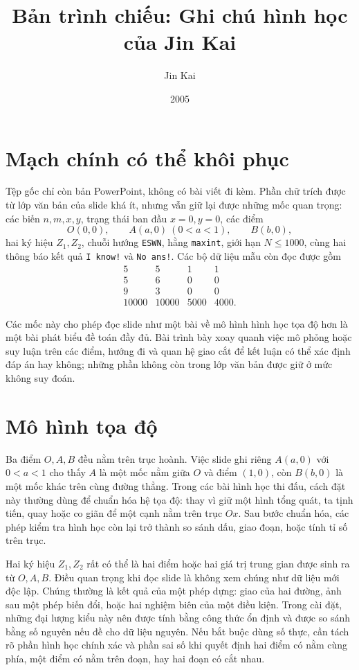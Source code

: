 \documentclass[11pt]{article}
\title{Bản trình chiếu: Ghi chú hình học của Jin Kai}
\author{Jin Kai}
\date{2005}
\begin{document}
\maketitle


\section{Mạch chính có thể khôi phục}

Tệp gốc chỉ còn bản PowerPoint, không có bài viết đi kèm. Phần chữ trích
được từ lớp văn bản của slide khá ít, nhưng vẫn giữ lại được những mốc quan
trọng: các biến \(n,m,x,y\), trạng thái ban đầu \(x=0,y=0\), các điểm
\[
  O(0,0),\qquad A(a,0)\ (0<a<1),\qquad B(b,0),
\]
hai ký hiệu \(Z_1,Z_2\), chuỗi hướng \texttt{ESWN}, hằng \texttt{maxint},
giới hạn \(N\le 1000\), cùng hai thông báo kết quả \texttt{I know!} và
\texttt{No ans!}. Các bộ dữ liệu mẫu còn đọc được gồm
\[
\begin{array}{rrrr}
5&5&1&1\\
5&6&0&0\\
9&3&0&0\\
10000&10000&5000&4000.
\end{array}
\]

Các mốc này cho phép đọc slide như một bài về mô hình hình học tọa độ hơn là
một bài phát biểu đề toán đầy đủ. Bài trình bày xoay quanh việc mô phỏng hoặc
suy luận trên các điểm, hướng đi và quan hệ giao cắt để kết luận có thể xác
định đáp án hay không; những phần không còn trong lớp văn bản được giữ ở mức
không suy đoán.

\section{Mô hình tọa độ}

Ba điểm \(O,A,B\) đều nằm trên trục hoành. Việc slide ghi riêng
\(A(a,0)\) với \(0<a<1\) cho thấy \(A\) là một mốc nằm giữa \(O\) và điểm
\((1,0)\), còn \(B(b,0)\) là một mốc khác trên cùng đường thẳng. Trong các
bài hình học thi đấu, cách đặt này thường dùng để chuẩn hóa hệ tọa độ: thay
vì giữ một hình tổng quát, ta tịnh tiến, quay hoặc co giãn để một cạnh nằm
trên trục \(Ox\). Sau bước chuẩn hóa, các phép kiểm tra hình học còn lại trở
thành so sánh dấu, giao đoạn, hoặc tính tỉ số trên trục.

Hai ký hiệu \(Z_1,Z_2\) rất có thể là hai điểm hoặc hai giá trị trung gian
được sinh ra từ \(O,A,B\). Điều quan trọng khi đọc slide là không xem chúng
như dữ liệu mới độc lập. Chúng thường là kết quả của một phép dựng: giao của
hai đường, ảnh sau một phép biến đổi, hoặc hai nghiệm biên của một điều kiện.
Trong cài đặt, những đại lượng kiểu này nên được tính bằng công thức ổn định
và được so sánh bằng số nguyên nếu đề cho dữ liệu nguyên. Nếu bắt buộc dùng
số thực, cần tách rõ phần hình học chính xác và phần sai số khi quyết định
hai điểm có nằm cùng phía, một điểm có nằm trên đoạn, hay hai đoạn có cắt
nhau.
\end{document}
